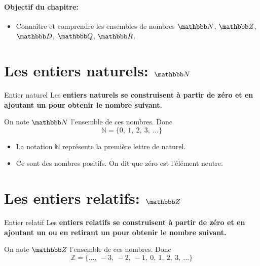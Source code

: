 \documentclass[10pt,a4paper,openany,twoside,prof]{book}
\begin{document}
	\entetegal{}

	\vspace{-7mm}
	\paragraph*{Objectif du chapitre:}
	\begin{itemize}
		\vspace{-2mm}
		\setlength\itemsep{-1mm}
		\item Connaître et comprendre les ensembles de nombres $\N$, $\Z$, $\D$, $\Q$, $\R$.
	\end{itemize}
	\vspace{-7mm}

\section{Les entiers naturels: $\N$}
\begin{defi}{Entier naturel}{}
 Les \bf{entiers naturels} se construisent à partir de zéro et en ajoutant un pour obtenir le nombre suivant.

 On note $\N$ l'ensemble de ces nombres. Donc $$\mathbb{N}=\{ 0,\ 1,\ 2,\ 3,\ \dots \}$$
\end{defi}

\begin{rems}{}{}
	\begin{itemize}
		\item
		La notation $\mathbb{N}$ représente la première lettre de \guillemotleft naturel\guillemotright.
		\item Ce sont des nombres positifs. On dit que zéro est l'élément neutre.
	\end{itemize}
\end{rems}

\section{Les entiers relatifs: $\Z$}
\begin{defi}{Entier relatif}{}
 Les \bf{entiers relatifs} se construisent à partir de zéro et en ajoutant un ou en retirant un pour obtenir le nombre suivant.

 On note $\Z$ l'ensemble de ces nombres. Donc $$\mathbb{Z}=\{ \dots ,\ -3,\ -2,\ -1,\ 0,\ 1,\ 2,\ 3,\ \dots \}$$
\end{defi}
\end{document}
